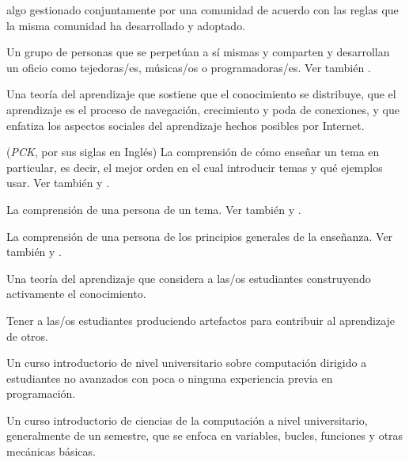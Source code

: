 \begin{description}
 algo gestionado conjuntamente por una comunidad 
de acuerdo con las reglas que la misma comunidad ha desarrollado y adoptado.

 Un grupo de personas que se perpetúan a sí mismas 
y comparten y desarrollan un oficio como tejedoras/es, músicas/os o programadoras/es. Ver también
.

 Una teoría del aprendizaje que sostiene que el conocimiento se distribuye, 
que el aprendizaje es el proceso de navegación, crecimiento y poda de conexiones, y que enfatiza los aspectos 
sociales del aprendizaje hechos posibles por Internet.

 (\emph{PCK}, por sus siglas en Inglés) La comprensión de cómo enseñar un tema en particular, es decir, el mejor orden en el cual introducir temas y qué ejemplos usar. Ver también
y .

 La comprensión de una 
persona de un tema. Ver también
y .

 La 
comprensión de una persona de los principios generales de la enseñanza. Ver también
y .

 Una teoría del aprendizaje que considera a 
las/os estudiantes construyendo activamente el conocimiento.

 Tener a las/os estudiantes
produciendo artefactos para contribuir al aprendizaje de otros.

 Un curso introductorio de nivel universitario sobre computación 
dirigido a estudiantes no avanzados con poca o ninguna experiencia previa en programación.

 Un curso introductorio de ciencias de la computación a nivel universitario, 
generalmente de un semestre, que se enfoca en variables, bucles, funciones y otras mecánicas básicas.


\end{description}
